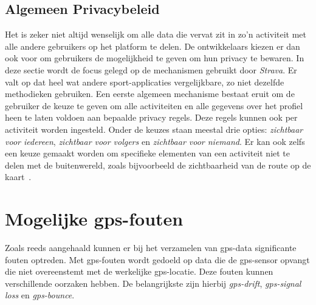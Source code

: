 \subsection{Algemeen Privacybeleid}\label{sec:Algemene Privacy}
Het is zeker niet altijd wenselijk om alle data die vervat zit in zo'n
activiteit met alle andere gebruikers op het platform te delen. De
ontwikkelaars kiezen er dan ook voor om gebruikers de mogelijkheid te geven om
hun privacy te bewaren. In deze sectie wordt de focus gelegd op de mechanismen
gebruikt door \textit{Strava}. Er valt op dat heel wat andere sport-applicaties
vergelijkbare, zo niet dezelfde methodieken gebruiken. Een eerste algemeen
mechanisme bestaat eruit om de gebruiker de keuze te geven om alle activiteiten
en alle gegevens over het profiel heen te laten voldoen aan bepaalde privacy
regels. Deze regels kunnen ook per activiteit worden ingesteld. Onder de keuzes
staan meestal drie opties: \textit{zichtbaar voor iedereen}, \textit{zichtbaar
    voor volgers} en \textit{zichtbaar voor niemand}. Er kan ook zelfs een keuze
gemaakt worden om specifieke elementen van een activiteit niet te delen met de
buitenwereld, zoals bijvoorbeeld de zichtbaarheid van de route op de
kaart~\cite{Activity24:online}.

\section{Mogelijke gps-fouten}\label{sec:gps-fouten}
Zoals reeds aangehaald kunnen er bij het verzamelen van \ac{gps}-data
significante fouten optreden. Met \ac{gps}-fouten wordt gedoeld op data die de
\ac{gps}-sensor opvangt die niet overeenstemt met de werkelijke
\ac{gps}-locatie. Deze fouten kunnen verschillende oorzaken hebben. De
belangrijkste zijn hierbij \textit{\ac{gps}-drift}, \textit{\ac{gps}-signal
    loss} en \textit{\ac{gps}-bounce}.

